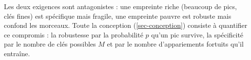 Les deux exigences sont antagonistes : une empreinte riche (beaucoup de pics, clés fines)
est spécifique mais fragile, une empreinte pauvre est robuste mais confond les morceaux.
Toute la conception (\cref{sec-conception}) consiste à quantifier ce compromis : la
robustesse par la probabilité $p$ qu'un pic survive, la spécificité par le nombre de clés
possibles $M$ et par le nombre d'appariements fortuits qu'il entraîne.
